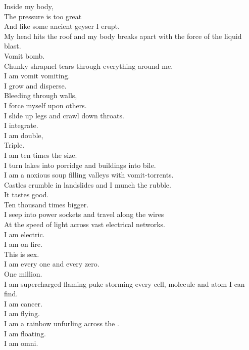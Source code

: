 Inside my body, \\
The pressure is too great \\
And like some ancient geyser I erupt. \\
My head hits the roof and my body breaks apart with the force of the liquid blast. \\

Vomit bomb. \\
Chunky shrapnel tears through everything around me. \\
I am vomit vomiting. \\
I grow and disperse. \\

Bleeding through walls, \\
I force myself upon others. \\
I slide up legs and crawl down throats. \\
I integrate. \\
I am double, \\
Triple. \\
I am ten times the size. \\

I turn lakes into porridge and buildings into bile. \\
I am a noxious soup filling valleys with vomit-torrents. \\
Castles crumble in landslides and I munch the rubble. \\
It tastes good. \\

Ten thousand times bigger. \\
I seep into power sockets and travel along the wires \\
At the speed of light across vast electrical networks. \\
I am electric. \\
I am on fire. \\
This is sex. \\
I am every one and every zero. \\

One million. \\
I am supercharged flaming puke storming every cell, molecule and atom I can find. \\
I am cancer. \\
I am flying. \\
I am a rainbow unfurling across the . \\
I am floating. \\
I am omni. \\

